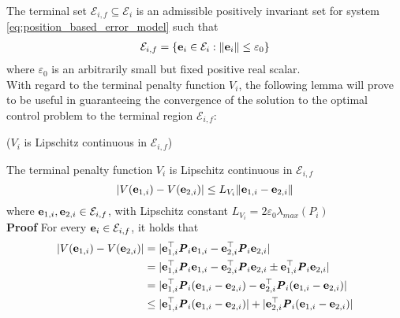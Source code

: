 The terminal set $\mathcal{E}_{i,f} \subseteq \mathcal{E}_i$ is an admissible
positively invariant set for system \eqref{eq:position_based_error_model}
such that
\begin{align}
  \mathcal{E}_{i,f} = \{\bm{\mathbf{e}}_i \in \mathcal{E}_i : \|\bm{\mathbf{e}}_i\| \leq \varepsilon_0 \}
\end{align}
where $\varepsilon_0$ is an arbitrarily small but fixed positive real scalar.\\

With regard to the terminal penalty function $V_i$, the following lemma will
prove to be useful in guaranteeing the convergence of the solution to the
optimal control problem to the terminal region $\mathcal{E}_{i,f}$:

\begin{bw_box}
\begin{lemma} ($V_i$ is Lipschitz continuous in $\mathcal{E}_{i,f}$)

  The terminal penalty function $V_i$ is Lipschitz continuous in
  $\mathcal{E}_{i,f}$
  $$|V(\bm{\mathbf{e}}_{1,i}) - V(\bm{\mathbf{e}}_{2,i})| \leq L_{V_i} \|\bm{\mathbf{e}}_{1,i} - \bm{\mathbf{e}}_{2,i}\|$$
  where $\bm{\mathbf{e}}_{1,i}, \bm{\mathbf{e}}_{2,i} \in \mathcal{E}_{i,f}$,
  with Lipschitz constant $L_{V_i} = 2 \varepsilon_0 \lambda_{max}(P_i)$\\

  \textbf{Proof} For every $\bm{\mathbf{e}}_i \in \mathcal{E}_{i,f}$, it holds that
  \begin{align}
    |V(\bm{\mathbf{e}}_{1,i}) - V(\bm{\mathbf{e}}_{2,i})| &= |\bm{\mathbf{e}}_{1,i}^{\top} \bm{\mathit{P}}_i \bm{\mathbf{e}}_{1,i} - \bm{\mathbf{e}}_{2,i}^{\top} \bm{\mathit{P}}_i \bm{\mathbf{e}}_{2,i}| \\
      &= |\bm{\mathbf{e}}_{1,i}^{\top} \bm{\mathit{P}}_i \bm{\mathbf{e}}_{1,i} - \bm{\mathbf{e}}_{2,i}^{\top} \bm{\mathit{P}}_i \bm{\mathbf{e}}_{2,i} \pm \bm{\mathbf{e}}_{1,i}^{\top} \bm{\mathit{P}}_i \bm{\mathbf{e}}_{2,i}| \\
      &= |\bm{\mathbf{e}}_{1,i}^{\top} \bm{\mathit{P}}_i (\bm{\mathbf{e}}_{1,i}-\bm{\mathbf{e}}_{2,i}) - \bm{\mathbf{e}}_{2,i}^{\top} \bm{\mathit{P}}_i (\bm{\mathbf{e}}_{1,i}-\bm{\mathbf{e}}_{2,i})| \\
      &\leq |\bm{\mathbf{e}}_{1,i}^{\top} \bm{\mathit{P}}_i (\bm{\mathbf{e}}_{1,i}-\bm{\mathbf{e}}_{2,i})| + |\bm{\mathbf{e}}_{2,i}^{\top} \bm{\mathit{P}}_i (\bm{\mathbf{e}}_{1,i}-\bm{\mathbf{e}}_{2,i})|
  \end{align}


\end{lemma}
\end{bw_box}
